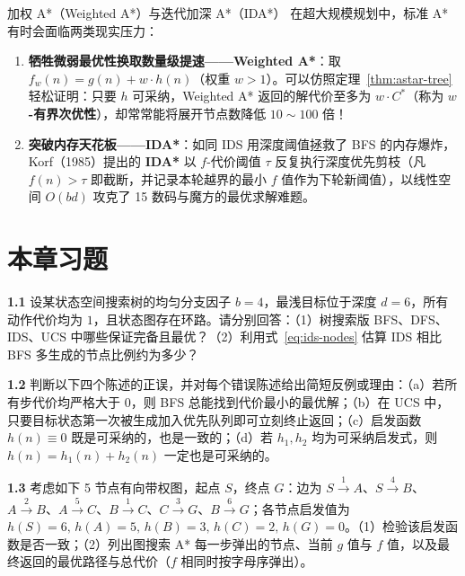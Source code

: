 \begin{extBox}{加权 A*（Weighted A*）与迭代加深 A*（IDA*）}
在超大规模规划中，标准 A* 有时会面临两类现实压力：
\begin{enumerate}
  \item \textbf{牺牲微弱最优性换取数量级提速——Weighted A*}：取 $f_w(n) = g(n) + w\cdot h(n)$（权重 $w > 1$）。可以仿照定理~\ref{thm:astar-tree} 轻松证明：只要 $h$ 可采纳，Weighted A* 返回的解代价至多为 $w \cdot C^*$（称为 \textbf{$w$-有界次优性}），却常常能将展开节点数降低 $10\sim 100$ 倍！
  \item \textbf{突破内存天花板——IDA*}：如同 IDS 用深度阈值拯救了 BFS 的内存爆炸，Korf（1985）提出的 \textbf{IDA*} 以 $f$-代价阈值 $\tau$ 反复执行深度优先剪枝（凡 $f(n)>\tau$ 即截断，并记录本轮越界的最小 $f$ 值作为下轮新阈值），以线性空间 $O(bd)$ 攻克了 15 数码与魔方的最优求解难题。
\end{enumerate}
\end{extBox}

\section{本章习题}\label{sec:ch1-ex}


\textbf{1.1} \quad 设某状态空间搜索树的均匀分支因子 $b=4$，最浅目标位于深度 $d=6$，所有动作代价均为 $1$，且状态图存在环路。请分别回答：（1）树搜索版 BFS、DFS、IDS、UCS 中哪些保证完备且最优？（2）利用式~\eqref{eq:ids-nodes} 估算 IDS 相比 BFS 多生成的节点比例约为多少？

\textbf{1.2} \quad 判断以下四个陈述的正误，并对每个错误陈述给出简短反例或理由：（a）若所有步代价均严格大于 $0$，则 BFS 总能找到代价最小的最优解；（b）在 UCS 中，只要目标状态第一次被生成加入优先队列即可立刻终止返回；（c）启发函数 $h(n)\equiv 0$ 既是可采纳的，也是一致的；（d）若 $h_1, h_2$ 均为可采纳启发式，则 $h(n) = h_1(n) + h_2(n)$ 一定也是可采纳的。


\textbf{1.3} \quad 考虑如下 5 节点有向带权图，起点 $S$，终点 $G$：边为 $S\xrightarrow{1} A$、$S\xrightarrow{4} B$、$A\xrightarrow{2} B$、$A\xrightarrow{5} C$、$B\xrightarrow{1} C$、$C\xrightarrow{3} G$、$B\xrightarrow{6} G$；各节点启发值为 $h(S)=6,\, h(A)=5,\, h(B)=3,\, h(C)=2,\, h(G)=0$。（1）检验该启发函数是否一致；（2）列出图搜索 A* 每一步弹出的节点、当前 $g$ 值与 $f$ 值，以及最终返回的最优路径与总代价（$f$ 相同时按字母序弹出）。

